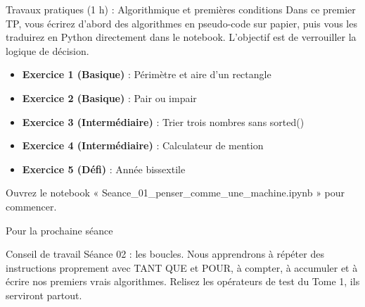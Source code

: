 \documentclass[aspectratio=169,11pt]{beamer}
\begin{document}
\begin{frame}{Travaux pratiques (1 h) : Algorithmique et premières conditions}
Dans ce premier TP, vous écrirez d'abord des algorithmes en pseudo-code sur papier, puis vous les traduirez en Python directement dans le notebook. L'objectif est de verrouiller la logique de décision.

\begin{itemize}
  \setlength{\itemsep}{1.5pt}\setlength{\parskip}{0pt}
  \item \textbf{Exercice 1 (Basique)} : Périmètre et aire d'un rectangle
  \item \textbf{Exercice 2 (Basique)} : Pair ou impair
  \item \textbf{Exercice 3 (Intermédiaire)} : Trier trois nombres sans sorted()
  \item \textbf{Exercice 4 (Intermédiaire)} : Calculateur de mention
  \item \textbf{Exercice 5 (Défi)} : Année bissextile
\end{itemize}
\vspace{4pt}

{\small\color{PyGris}Ouvrez le notebook « Seance\_01\_penser\_comme\_une\_machine.ipynb » pour commencer.}
\end{frame}
\begin{frame}{Pour la prochaine séance}
\begin{exampleblock}{Conseil de travail}
Séance 02 : les boucles. Nous apprendrons à répéter des instructions proprement avec TANT QUE et POUR, à compter, à accumuler et à écrire nos premiers vrais algorithmes. Relisez les opérateurs de test du Tome 1, ils serviront partout.
\end{exampleblock}
\end{frame}
\end{document}
